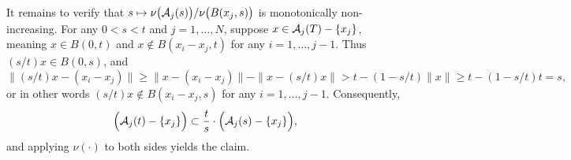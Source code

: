 	It remains to verify that $s \mapsto \nu\bigl(\mathcal{A}_j(s)\bigr)/\nu\bigl(B(x_j,s)\bigr)$ is monotonically non-increasing. For any $0 < s < t$ and $j = 1,\ldots,N$, suppose $x \in \mathcal{A}_j(T) - \{x_j\}$, meaning $x \in B(0,t)$ and $x \not\in B(x_i - x_j,t)$ for any $i = 1,\ldots,j - 1$. Thus $(s/t)x \in B(0,s)$, and
	\begin{equation*}
	\|(s/t)x - (x_i - x_j)\| \geq \|x - (x_i - x_j)\| - \|x - (s/t)x\| > t - (1 - s/t)\|x\| \geq t - (1 - s/t)t = s,
	\end{equation*}
	or in other words $(s/t)x \not\in B(x_i - x_j,s)$ for any $i = 1,\ldots,j - 1$. Consequently,
	\begin{equation*}
	\Bigl(\mathcal{A}_j(t) - \{x_j\}\Bigr) \subset \frac{t}{s} \cdot \Bigl(\mathcal{A}_{j}(s)- \{x_j\}\Bigr),
	\end{equation*}
	and applying $\nu(\cdot)$ to both sides yields the claim.
	
